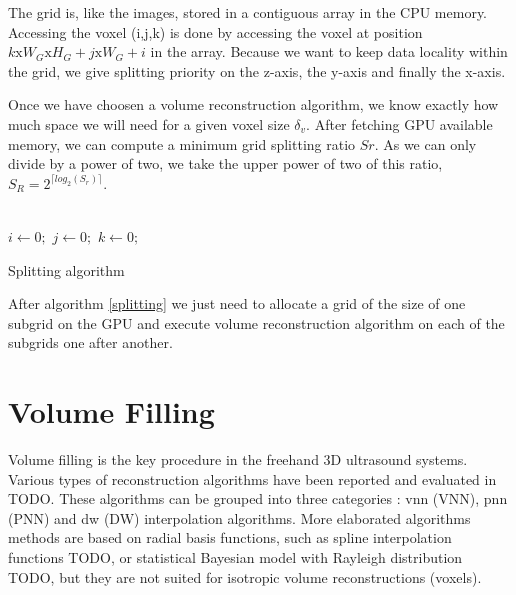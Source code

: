 \documentclass[12pt,journal,compsoc]{IEEEtran}
\begin{document}
The grid is, like the images, stored in a contiguous array in the CPU memory. Accessing the voxel (i,j,k) is done by accessing the voxel at position $k\text{x}W_G\text{x}H_G + j\text{x}W_G + i$ in the array.
Because we want to keep data locality within the grid, we give splitting priority on the z-axis, the y-axis and finally the x-axis.

Once we have choosen a volume reconstruction algorithm, we know exactly how much space we will need for a given voxel size $\delta_v$. After fetching GPU available memory, we can compute a minimum grid splitting ratio $Sr$. As we can only divide by a power of two, we take the upper power of two of this ratio,  $S_R = 2^{\lceil log_2(S_r) \rceil}$.

\begin{samepage}
\begin{algorithm}
\\
\vspace{0.5cm} $i\gets0;$ $j\gets0;$ $k\gets0;$\\
\caption{Splitting algorithm}
\label{splitting}
\end{algorithm}
\end{samepage}

After algorithm \ref{splitting} we just need to allocate a grid of the size of one subgrid on the GPU and execute volume reconstruction algorithm on each of the subgrids one after another.

\section{Volume Filling}

Volume filling is the key procedure in the freehand 3D ultrasound systems. Various types of reconstruction algorithms have been reported and evaluated in TODO. These algorithms can be grouped into three categories : \acl{vnn} (VNN), \acl{pnn} (PNN) and \acl{dw} (DW) interpolation algorithms. 
More elaborated algorithms methods are based on radial basis functions, such as spline interpolation functions TODO, or statistical Bayesian model with Rayleigh distribution TODO, but they are not suited for isotropic volume reconstructions (voxels).\par
\end{document}
